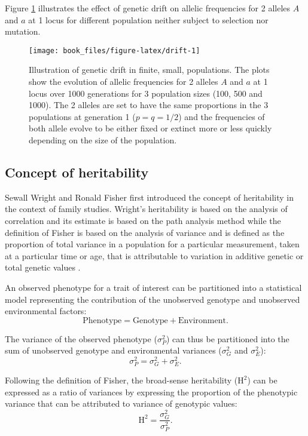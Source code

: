 \documentclass[]{book}
\begin{document}
Figure \ref{fig:drift} illustrates the effect of genetic drift on allelic
frequencies for 2 alleles \(A\) and \(a\) at 1 locus for different
population neither subject to selection nor mutation.



\begin{figure}

{\centering \texttt{[image: book\_files/figure-latex/drift-1]} 

}

\caption{Illustration of genetic drift in finite, small, populations. The plots show the evolution of allelic frequencies for 2 alleles \(A\) and \(a\) at 1 locus over 1000 generations for 3 population sizes (100, 500 and 1000). The 2 alleles are set to have the same proportions in the 3 populations at generation 1 (\(p = q = 1/2\)) and the frequencies of both allele evolve to be either fixed or extinct more or less quickly depending on the size of the population.}\label{fig:drift}
\end{figure}

\hypertarget{concept-of-heritability}{%
\subsection{Concept of heritability}\label{concept-of-heritability}}

Sewall Wright and Ronald Fisher first introduced the concept of
heritability in the context of family studies. Wright's heritability is
based on the analysis of correlation and its estimate is based on the
path analysis method \citep{wright1921correlation} while the definition of
Fisher is based on the analysis of variance and is defined as the
proportion of total variance in a population for a particular
measurement, taken at a particular time or age, that is attributable to
variation in additive genetic or total genetic values \citep{fisher1919xv}.

An observed phenotype for a trait of interest can be partitioned into a
statistical model representing the contribution of the unobserved
genotype and unobserved environmental factors:
\[\text{Phenotype}  = \text{Genotype} + \text{Environment}.\]

The variance of the observed phenotype (\(\sigma^2_P\)) can thus be
partitioned into the sum of unobserved genotype and environmental
variances (\(\sigma^2_G\) and \(\sigma^2_E\)):
\[\sigma^2_P = \sigma^2_G + \sigma^2_E.\]

Following the definition of Fisher, the broad-sense heritability
(\(\text{H}^2\)) can be expressed as a ratio of variances by expressing
the proportion of the phenotypic variance that can be attributed to
variance of genotypic values:
\[\text{H}^2 = \frac{\sigma^2_G}{\sigma^2_P}.\]
\end{document}
